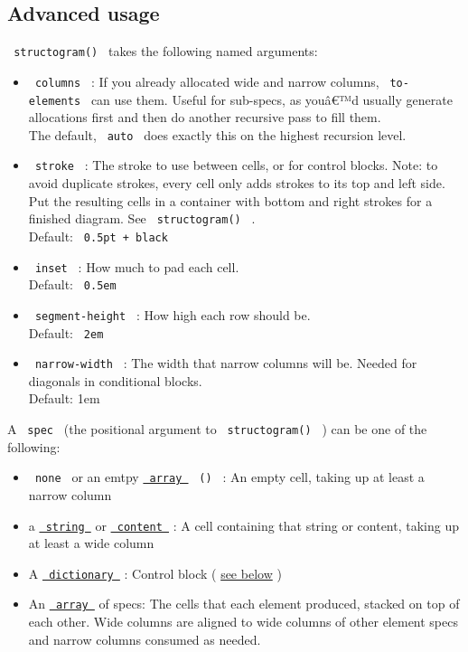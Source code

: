 \subsection{Advanced usage}\label{advanced-usage}

\texttt{\ structogram()\ } takes the following named arguments:

\begin{itemize}
\tightlist
\item
  \texttt{\ columns\ } : If you already allocated wide and narrow
  columns, \texttt{\ to-elements\ } can use them. Useful for sub-specs,
  as youâ€™d usually generate allocations first and then do another
  recursive pass to fill them.\\
  The default, \texttt{\ auto\ } does exactly this on the highest
  recursion level.
\item
  \texttt{\ stroke\ } : The stroke to use between cells, or for control
  blocks. Note: to avoid duplicate strokes, every cell only adds strokes
  to its top and left side. Put the resulting cells in a container with
  bottom and right strokes for a finished diagram. See
  \texttt{\ structogram()\ } .\\
  Default: \texttt{\ 0.5pt\ +\ black\ }
\item
  \texttt{\ inset\ } : How much to pad each cell.\\
  Default: \texttt{\ 0.5em\ }
\item
  \texttt{\ segment-height\ } : How high each row should be.\\
  Default: \texttt{\ 2em\ }
\item
  \texttt{\ narrow-width\ } : The width that narrow columns will be.
  Needed for diagonals in conditional blocks.\\
  Default: 1em
\end{itemize}

A \texttt{\ spec\ } (the positional argument to
\texttt{\ structogram()\ } ) can be one of the following:

\begin{itemize}
\tightlist
\item
  \texttt{\ none\ } or an emtpy
  \href{https://typst.app/docs/reference/foundations/array/}{\texttt{\ array\ }}
  \texttt{\ ()\ } : An empty cell, taking up at least a narrow column
\item
  a
  \href{https://typst.app/docs/reference/foundations/str/}{\texttt{\ string\ }}
  or
  \href{https://typst.app/docs/reference/foundations/content/}{\texttt{\ content\ }}
  : A cell containing that string or content, taking up at least a wide
  column
\item
  A
  \href{https://typst.app/docs/reference/foundations/dictionary/}{\texttt{\ dictionary\ }}
  : Control block (
  \href{https://github.com/typst/packages/raw/main/packages/preview/structogrammer/0.1.1/\#control-blocks}{see
  below} )
\item
  An
  \href{https://typst.app/docs/reference/foundations/array/}{\texttt{\ array\ }}
  of specs: The cells that each element produced, stacked on top of each
  other. Wide columns are aligned to wide columns of other element specs
  and narrow columns consumed as needed.
\end{itemize}

